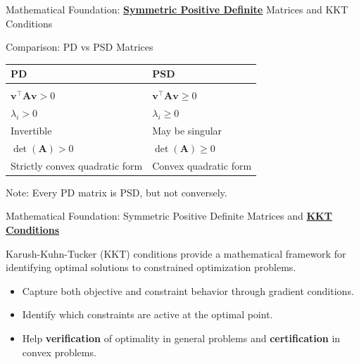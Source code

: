 \documentclass{beamer}
\begin{document}
\begin{frame}{Mathematical Foundation: \textbf{\underline{Symmetric Positive Definite}} Matrices and KKT Conditions}

\begin{alertblock}{Comparison: PD vs PSD Matrices}

\begin{tabular}{ll}
\textbf{PD} & \textbf{PSD} \\
\hline
\hfill \\
$\bm{v}^\top \bm{A} \bm{v} > 0$ & $\bm{v}^\top \bm{A} \bm{v} \geq 0$ \\
$\lambda_i > 0$ & $\lambda_i \geq 0$ \\
Invertible & May be singular \\
$\det(\bm{A}) > 0$ & $\det(\bm{A}) \geq 0$ \\
Strictly convex quadratic form & Convex quadratic form \\
\end{tabular}

\vspace{0.3cm}

Note: Every PD matrix is PSD, but not conversely.

\end{alertblock}

\end{frame}


\begin{frame}{{Mathematical Foundation: Symmetric Positive Definite Matrices and \textbf{\underline{KKT Conditions}}}}

    Karush-Kuhn-Tucker (KKT) conditions provide a mathematical framework for identifying optimal solutions to constrained optimization problems.
    
    \begin{itemize}
        \item Capture both objective and constraint behavior through gradient conditions.
        \item Identify which constraints are active at the optimal point.
        \item Help \textbf{verification} of optimality in general problems and \textbf{certification} in convex problems.
    \end{itemize}

\end{frame}
\end{document}
